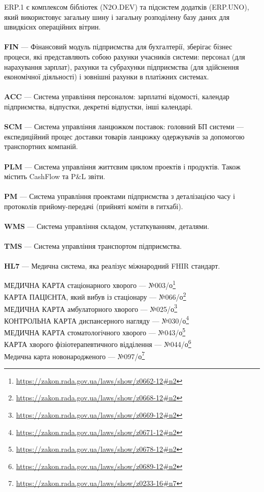 ERP.1 є комплексом бібліотек (N2O.DEV) та підсистем додатків (ERP.UNO),
який використовує загальну шину і загальну розподілену базу даних для швидкіснх операційних вітрин.
\\
\\
\textbf{FIN} — Фінансовий модуль підприємства для бухгалтерії, зберігає бізнес процеси,
        які представляють собою рахунки учасників системи: персонал (для нарахування зарплат),
        рахунки та субрахунки підприємства (для здійснення економічної діяльності) і
        зовнішні рахунки в платіжних системах.
\\
\\
\textbf{ACC} — Система управління персоналом: зарплатні відомості,
        календар підприємства, відпустки, декретні відпустки, інші календарі.
\\
\\
\textbf{SCM} — Система управління ланцюжком поставок: головний БП системи —
           експедиційний процес доставки товарів ланцюжку одержувачів
           за допомогою транспортних компаній.
\\
\\
\textbf{PLM} — Система управління життєвим циклом проектів і продуктів.
           Також містить CashFlow та P\&L звіти.
\\
\\
\textbf{PM} — Система управління проектами підприємства з деталізацією
           часу і протоколів прийому-передачі (прийняті коміти в гитхабі).
\\
\\
\textbf{WMS} — Система управління складом, устаткуванням, деталями.
\\
\\
\textbf{TMS} — Система управління транспортом підприємства.
\\
\\
\textbf{HL7} — Медична система, яка реалізує міжнародний FHIR стандарт.

\noindent МЕДИЧНА КАРТА стаціонарного хворого --- №003/о\footnote{\url{https://zakon.rada.gov.ua/laws/show/z0662-12\#n2}}\\
КАРТА ПАЦІЄНТА, який вибув із стаціонару --- №066/о\footnote{\url{https://zakon.rada.gov.ua/laws/show/z0668-12\#n2}}\\
МЕДИЧНА КАРТА амбулаторного хворого --- №025/о\footnote{\url{https://zakon.rada.gov.ua/laws/show/z0669-12\#n2}}\\
КОНТРОЛЬНА КАРТА диспансерного нагляду --- №030/о\footnote{\url{https://zakon.rada.gov.ua/laws/show/z0671-12\#n2}}\\
МЕДИЧНА КАРТА стоматологічного хворого --- №043/о\footnote{\url{https://zakon.rada.gov.ua/laws/show/z0678-12\#n2}}\\
КАРТА хворого фізіотерапевтичного відділення --- №044/о\footnote{\url{https://zakon.rada.gov.ua/laws/show/z0689-12\#n2}}\\
Медична карта новонародженого --- №097/о\footnote{\url{https://zakon.rada.gov.ua/laws/show/z0233-16\#n7}}\\
\medskip
\newpage
